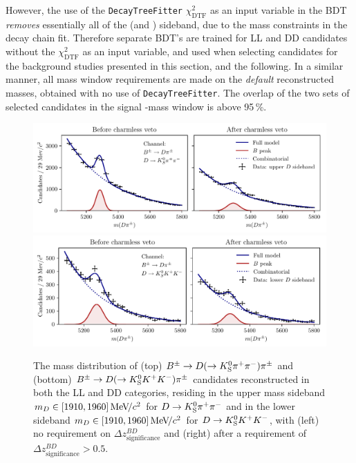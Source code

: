 However, the use of the \texttt{DecayTreeFitter} $\chi^2_\mathrm{DTF}$ as an input variable in the BDT \emph{removes} essentially all of the \D (and \KS) sideband, due to the mass constraints in the decay chain fit. Therefore separate BDT's are trained for LL and DD candidates without the $\chi^2_\mathrm{DTF}$ as an input variable, and used when selecting candidates for the background studies presented in this section, and the following. In a similar manner, all mass window requirements are made on the \emph{default} reconstructed masses, obtained with no use of \texttt{DecayTreeFitter}. The overlap of the two sets of selected candidates in the signal \B-mass window is above 95\,\%.

\begin{figure}[tbp]
    \centering
    \includegraphics[width=0.95\columnwidth]{figures/analysis/background_checks/charmless_Pi_PiPi.pdf}
    \includegraphics[width=0.95\columnwidth]{figures/analysis/background_checks/charmless_Pi_KK.pdf}
    \caption{The \B mass distribution of (top) ${{B}^\pm}\rightarrow{\ensuremath{D}}(\rightarrow{\ensuremath{{K}^0_{\mathrm{S}}}}{\ensuremath{{\pi}^+}}{\ensuremath{{\pi}^-}}){{\pi}^\pm}$ and (bottom) ${{B}^\pm}\rightarrow{\ensuremath{D}}(\rightarrow{\ensuremath{{K}^0_{\mathrm{S}}}}{\ensuremath{{K}^+}}{\ensuremath{{K}^-}}){{\pi}^\pm}$ candidates reconstructed in both the LL and DD categories, residing in the upper \D mass sideband $m_D\in [1910, 1960]\text{\,Me\kern -0.1em V\!/}c^2$ for $D\rightarrow{\ensuremath{{K}^0_{\mathrm{S}}}}{\ensuremath{{\pi}^+}}{\ensuremath{{\pi}^-}}$ and in the lower sideband $m_D\in [1910, 1960]\text{\,Me\kern -0.1em V\!/}c^2$ for ${D}\rightarrow{\ensuremath{{K}^0_{\mathrm{S}}}}{\ensuremath{{K}^+}}{\ensuremath{{K}^-}}$, with (left) no requirement on $\Delta z^{BD}_{\text{significance}}$ and (right) after a requirement of $\Delta z^{BD}_{\text{significance}} > 0.5$. }
    \label{fig:charmless_Bmass_DPi}
\end{figure}

